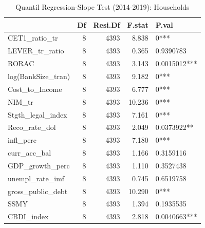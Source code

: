 \begin{table}[ht]
\centering
\caption{Quantil Regression-Slope Test (2014-2019): Households} 
\begingroup\small
\begin{tabular}{lrrrl}
  \toprule
 & Df & Resi.Df & F.stat & P.val \\ 
  \midrule
CET1\_ratio\_tr & 8 & 4393 & 8.838 & 0*** \\ 
  LEVER\_tr\_ratio & 8 & 4393 & 0.365 & 0.9390783 \\ 
  RORAC & 8 & 4393 & 3.143 & 0.0015012*** \\ 
  log(BankSize\_tran) & 8 & 4393 & 9.182 & 0*** \\ 
  Cost\_to\_Income & 8 & 4393 & 6.777 & 0*** \\ 
  NIM\_tr & 8 & 4393 & 10.236 & 0*** \\ 
  Stgth\_legal\_index & 8 & 4393 & 7.161 & 0*** \\ 
  Reco\_rate\_dol & 8 & 4393 & 2.049 & 0.0373922** \\ 
  infl\_perc & 8 & 4393 & 7.180 & 0*** \\ 
  curr\_acc\_bal & 8 & 4393 & 1.166 & 0.3159116 \\ 
  GDP\_growth\_perc & 8 & 4393 & 1.110 & 0.3527438 \\ 
  unempl\_rate\_imf & 8 & 4393 & 0.745 & 0.6519758 \\ 
  gross\_public\_debt & 8 & 4393 & 10.290 & 0*** \\ 
  SSMY & 8 & 4393 & 1.394 & 0.1935535 \\ 
  CBDI\_index & 8 & 4393 & 2.818 & 0.0040663*** \\ 
   \bottomrule
\end{tabular}
\endgroup
\end{table}
